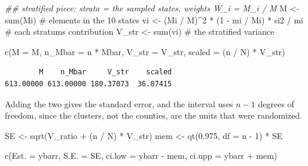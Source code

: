 \documentclass[
  letterpaper,
  DIV=11,
  numbers=noendperiod]{scrreprt}
\newenvironment{Shaded}{\begin{snugshade}}{\end{snugshade}}
\newcommand{\AttributeTok}[1]{\textcolor[rgb]{0.40,0.45,0.13}{#1}}
\newcommand{\CommentTok}[1]{\textcolor[rgb]{0.37,0.37,0.37}{#1}}
\newcommand{\DecValTok}[1]{\textcolor[rgb]{0.68,0.00,0.00}{#1}}
\newcommand{\DocumentationTok}[1]{\textcolor[rgb]{0.37,0.37,0.37}{\textit{#1}}}
\newcommand{\FloatTok}[1]{\textcolor[rgb]{0.68,0.00,0.00}{#1}}
\newcommand{\FunctionTok}[1]{\textcolor[rgb]{0.28,0.35,0.67}{#1}}
\newcommand{\NormalTok}[1]{\textcolor[rgb]{0.00,0.23,0.31}{#1}}
\newcommand{\OtherTok}[1]{\textcolor[rgb]{0.00,0.23,0.31}{#1}}
\newcommand{\SpecialCharTok}[1]{\textcolor[rgb]{0.37,0.37,0.37}{#1}}
\renewcommand{\[}{\begin{equation}}
\renewcommand{\]}{\end{equation}}
\begin{document}
\begin{Shaded}
\begin{Highlighting}[]
\DocumentationTok{\#\# stratified piece: strata = the sampled states, weights W\_i = M\_i / M}
\NormalTok{M     }\OtherTok{\textless{}{-}} \FunctionTok{sum}\NormalTok{(Mi)                                  }\CommentTok{\# elements in the 10 states}
\NormalTok{vi    }\OtherTok{\textless{}{-}}\NormalTok{ (Mi }\SpecialCharTok{/}\NormalTok{ M)}\SpecialCharTok{\^{}}\DecValTok{2} \SpecialCharTok{*}\NormalTok{ (}\DecValTok{1} \SpecialCharTok{{-}}\NormalTok{ mi }\SpecialCharTok{/}\NormalTok{ Mi) }\SpecialCharTok{*}\NormalTok{ si2 }\SpecialCharTok{/}\NormalTok{ mi    }\CommentTok{\# each stratum\textquotesingle{}s contribution}
\NormalTok{V\_str }\OtherTok{\textless{}{-}} \FunctionTok{sum}\NormalTok{(vi)                                  }\CommentTok{\# the stratified variance}

\FunctionTok{c}\NormalTok{(}\AttributeTok{M =}\NormalTok{ M, }\AttributeTok{n\_Mbar =}\NormalTok{ n }\SpecialCharTok{*}\NormalTok{ Mbar, }\AttributeTok{V\_str =}\NormalTok{ V\_str, }\AttributeTok{scaled =}\NormalTok{ (n }\SpecialCharTok{/}\NormalTok{ N) }\SpecialCharTok{*}\NormalTok{ V\_str)}
\end{Highlighting}
\end{Shaded}

\begin{verbatim}
        M    n_Mbar     V_str    scaled 
613.00000 613.00000 180.37073  36.07415 
\end{verbatim}

Adding the two gives the standard error, and the interval uses \(n - 1\)
degrees of freedom, since the clusters, not the counties, are the units
that were randomized.

\begin{Shaded}
\begin{Highlighting}[]
\NormalTok{SE  }\OtherTok{\textless{}{-}} \FunctionTok{sqrt}\NormalTok{(V\_ratio }\SpecialCharTok{+}\NormalTok{ (n }\SpecialCharTok{/}\NormalTok{ N) }\SpecialCharTok{*}\NormalTok{ V\_str)}
\NormalTok{mem }\OtherTok{\textless{}{-}} \FunctionTok{qt}\NormalTok{(}\FloatTok{0.975}\NormalTok{, }\AttributeTok{df =}\NormalTok{ n }\SpecialCharTok{{-}} \DecValTok{1}\NormalTok{) }\SpecialCharTok{*}\NormalTok{ SE}

\FunctionTok{c}\NormalTok{(}\AttributeTok{Est. =}\NormalTok{ ybarr, }\AttributeTok{S.E. =}\NormalTok{ SE, }\AttributeTok{ci.low =}\NormalTok{ ybarr }\SpecialCharTok{{-}}\NormalTok{ mem, }\AttributeTok{ci.upp =}\NormalTok{ ybarr }\SpecialCharTok{+}\NormalTok{ mem)}
\end{Highlighting}
\end{Shaded}
\end{document}
